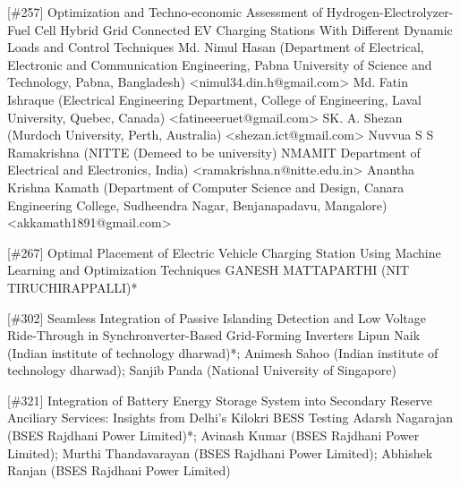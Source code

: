 {} \begin{abstract_online} {[\#257] Optimization and Techno-economic Assessment of Hydrogen-Electrolyzer-Fuel Cell Hybrid Grid Connected EV Charging Stations With Different Dynamic Loads and Control Techniques} {} {Md. Nimul Hasan (Department of Electrical, Electronic and Communication Engineering, Pabna University of Science and Technology, Pabna, Bangladesh) <nimul34.din.h@gmail.com> 
		Md. Fatin Ishraque (Electrical Engineering Department, College of Engineering, Laval University, Quebec, Canada) <fatineeeruet@gmail.com> 
		SK. A. Shezan (Murdoch University, Perth, Australia) <shezan.ict@gmail.com> 
		Nuvvua S S Ramakrishna (NITTE (Demeed to be university) NMAMIT Department of Electrical and Electronics, India) <ramakrishna.n@nitte.edu.in> 
		Anantha Krishna Kamath (Department of Computer Science and Design, Canara Engineering College, Sudheendra Nagar, Benjanapadavu, Mangalore) <akkamath1891@gmail.com> } {}  \end{abstract_online}
{} \begin{abstract_online} {[\#267] Optimal Placement of Electric Vehicle Charging Station Using Machine Learning and Optimization Techniques} {} {GANESH  MATTAPARTHI (NIT TIRUCHIRAPPALLI)*} {}  \end{abstract_online} 
{} \begin{abstract_online} {[\#302] Seamless Integration of Passive Islanding Detection and Low Voltage Ride-Through in Synchronverter-Based Grid-Forming Inverters} {} {Lipun Naik (Indian institute of technology dharwad)*; Animesh Sahoo (Indian institute of technology dharwad); Sanjib Panda (National University of Singapore)} {}  \end{abstract_online} 
{} \begin{abstract_online} {[\#321] Integration of Battery Energy Storage System into Secondary Reserve Anciliary Services: Insights from Delhi’s Kilokri BESS Testing} {} {Adarsh Nagarajan (BSES Rajdhani Power Limited)*; Avinash Kumar (BSES Rajdhani Power Limited); Murthi Thandavarayan (BSES Rajdhani Power Limited); Abhishek Ranjan (BSES Rajdhani Power Limited)} {}  \end{abstract_online} 